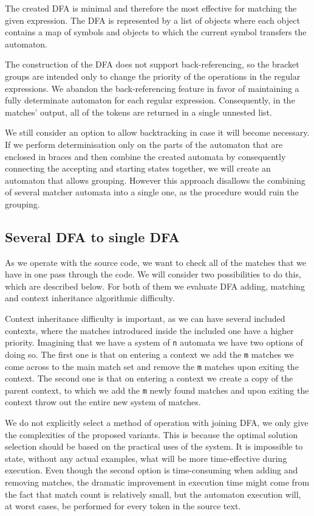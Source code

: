 The created DFA is minimal and therefore the most effective for matching
the given expression. The DFA is represented by a list of objects where
each object contains a map of symbols and objects to which the current
symbol transfers the automaton.

The construction of the DFA does not support back-referencing, so the bracket
groups are intended only to change the priority of the operations in the
regular expressions. We abandon the back-referencing feature in favor of
maintaining a fully determinate automaton for each regular expression.
Consequently, in the matches' output, all of the tokens are returned in a
single unnested list. 


We still consider an option to allow backtracking in case it will become
necessary.  If we perform determinisation only on the parts of the automaton
that are enclosed in braces and then combine the created automata by
consequently connecting the accepting and starting states together, we will
create an automaton that allows grouping. However this approach disallows the
combining of several matcher automata into a single one, as the procedure would
ruin the grouping.

\subsection{Several DFA to single DFA}
As we operate with the source code, we want to check all of the matches that we
have in one pass through the code. We will consider two possibilities to do
this, which are described below. For both of them we evaluate DFA adding,
matching and context inheritance algorithmic difficulty.

Context inheritance difficulty is important, as we can have several included
contexts, where the matches introduced inside the included one have a higher
priority. Imagining that we have a system of \verb/n/ automata we have two
options of doing so. The first one is that on entering a context we add the
\verb/m/ matches we come across to the main match set and remove the \verb/m/
matches upon exiting the context. The second one is that on entering a context
we create a copy of the parent context, to which we add the \verb/m/ newly
found matches and upon exiting the context throw out the entire new system of
matches.

We do not explicitly select a method of operation with joining DFA, we only
give the complexities of the proposed variants. This is because the optimal
solution selection should be based on the practical uses of the system. It is
impossible to state, without any actual examples, what will be more
time-effective during execution. Even though the second option is
time-consuming when adding and removing matches, the dramatic improvement in
execution time might come from the fact that match count is relatively small,
but the automaton execution will, at worst cases, be performed for every token
in the source text.

